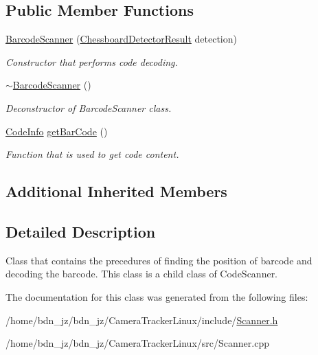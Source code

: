 \subsection*{Public Member Functions}
\begin{DoxyCompactItemize}
\item 
\mbox{\label{classBarcodeScanner_a75a2c1664c6fae1af960db85e4a118c1}} 
\hyperlink{classBarcodeScanner_a75a2c1664c6fae1af960db85e4a118c1}{Barcode\+Scanner} (\hyperlink{structChessboardDetectorResult}{Chessboard\+Detector\+Result} detection)
\begin{DoxyCompactList}\small\item\em Constructor that performs code decoding. \end{DoxyCompactList}\item 
\mbox{\label{classBarcodeScanner_a8a9f32500c2e83547fd5cdce8450634a}} 
\hyperlink{classBarcodeScanner_a8a9f32500c2e83547fd5cdce8450634a}{$\sim$\+Barcode\+Scanner} ()
\begin{DoxyCompactList}\small\item\em Deconstructor of Barcode\+Scanner class. \end{DoxyCompactList}\item 
\mbox{\label{classBarcodeScanner_a33b8ce809789f70f0c5b63447175d218}} 
\hyperlink{structCodeInfo}{Code\+Info} \hyperlink{classBarcodeScanner_a33b8ce809789f70f0c5b63447175d218}{get\+Bar\+Code} ()
\begin{DoxyCompactList}\small\item\em Function that is used to get code content. \end{DoxyCompactList}\end{DoxyCompactItemize}
\subsection*{Additional Inherited Members}


\subsection{Detailed Description}
Class that contains the precedures of finding the position of barcode and decoding the barcode. This class is a child class of Code\+Scanner. 

The documentation for this class was generated from the following files\+:\begin{DoxyCompactItemize}
\item 
/home/bdn\+\_\+jz/bdn\+\_\+jz/\+Camera\+Tracker\+Linux/include/\hyperlink{Scanner_8h}{Scanner.\+h}\item 
/home/bdn\+\_\+jz/bdn\+\_\+jz/\+Camera\+Tracker\+Linux/src/Scanner.\+cpp\end{DoxyCompactItemize}
